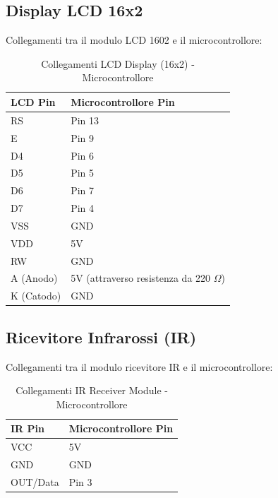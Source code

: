 \documentclass[a4paper, 12pt]{article}
\begin{document}
\subsection{Display LCD 16x2}
\label{subsec:setup-lcd}
Collegamenti tra il modulo LCD 1602 e il microcontrollore:

\begin{table}[H]
    \centering
    \caption{Collegamenti LCD Display (16x2) - Microcontrollore}
    \label{tab:lcd-16x2-connections}
    \begin{tabular}{ll}
        \toprule
        \textbf{LCD Pin} & \textbf{Microcontrollore Pin}                \\
        \midrule
        RS               & Pin 13                                       \\
        E                & Pin 9                                        \\
        D4               & Pin 6                                        \\
        D5               & Pin 5                                        \\
        D6               & Pin 7                                        \\
        D7               & Pin 4                                        \\
        VSS              & GND                                          \\
        VDD              & 5V                                           \\
        RW               & GND                                          \\
        A (Anodo)        & 5V (attraverso resistenza da 220 \(\Omega\)) \\
        K (Catodo)       & GND                                          \\
        \bottomrule
    \end{tabular}
\end{table}

\subsection{Ricevitore Infrarossi (IR)}
\label{subsec:setup-ir}
Collegamenti tra il modulo ricevitore IR e il microcontrollore:

\begin{table}[H]
    \centering
    \caption{Collegamenti IR Receiver Module - Microcontrollore}
    \label{tab:ir-receiver-connections}
    \begin{tabular}{ll}
        \toprule
        \textbf{IR Pin} & \textbf{Microcontrollore Pin} \\
        \midrule
        VCC             & 5V                            \\
        GND             & GND                           \\
        OUT/Data        & Pin 3                         \\
        \bottomrule
    \end{tabular}
\end{table}
\end{document}
